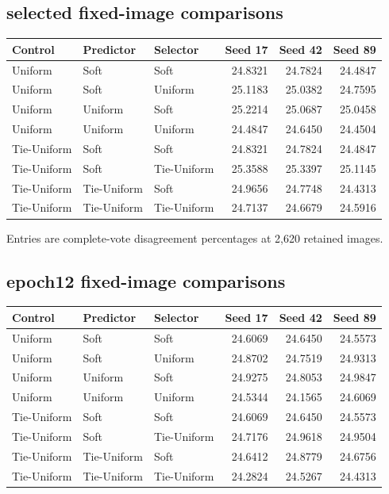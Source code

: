 \documentclass[10pt]{article}
\begin{document}

\clearpage\subsection*{selected fixed-image comparisons}\begin{longtable}{lllrrr}\toprule Control & Predictor & Selector & Seed 17 & Seed 42 & Seed 89\\\midrule\endhead
Uniform & Soft & Soft & 24.8321 & 24.7824 & 24.4847\\
Uniform & Soft & Uniform & 25.1183 & 25.0382 & 24.7595\\
Uniform & Uniform & Soft & 25.2214 & 25.0687 & 25.0458\\
Uniform & Uniform & Uniform & 24.4847 & 24.6450 & 24.4504\\
Tie-Uniform & Soft & Soft & 24.8321 & 24.7824 & 24.4847\\
Tie-Uniform & Soft & Tie-Uniform & 25.3588 & 25.3397 & 25.1145\\
Tie-Uniform & Tie-Uniform & Soft & 24.9656 & 24.7748 & 24.4313\\
Tie-Uniform & Tie-Uniform & Tie-Uniform & 24.7137 & 24.6679 & 24.5916\\
\bottomrule\end{longtable}
Entries are complete-vote disagreement percentages at 2,620 retained images.
\clearpage\subsection*{epoch12 fixed-image comparisons}\begin{longtable}{lllrrr}\toprule Control & Predictor & Selector & Seed 17 & Seed 42 & Seed 89\\\midrule\endhead
Uniform & Soft & Soft & 24.6069 & 24.6450 & 24.5573\\
Uniform & Soft & Uniform & 24.8702 & 24.7519 & 24.9313\\
Uniform & Uniform & Soft & 24.9275 & 24.8053 & 24.9847\\
Uniform & Uniform & Uniform & 24.5344 & 24.1565 & 24.6069\\
Tie-Uniform & Soft & Soft & 24.6069 & 24.6450 & 24.5573\\
Tie-Uniform & Soft & Tie-Uniform & 24.7176 & 24.9618 & 24.9504\\
Tie-Uniform & Tie-Uniform & Soft & 24.6412 & 24.8779 & 24.6756\\
Tie-Uniform & Tie-Uniform & Tie-Uniform & 24.2824 & 24.5267 & 24.4313\\
\bottomrule\end{longtable}
\end{document}
